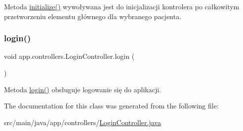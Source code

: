 Metoda \mbox{\hyperlink{classapp_1_1controllers_1_1_login_controller_aa342a8db861c23f873083658cefa7904}{initialize()}} wywoływana jest do inicjalizacji kontrolera po całkowitym przetworzeniu elementu głównego dla wybranego pacjenta. \mbox{\label{classapp_1_1controllers_1_1_login_controller_a89c1570ab24485594029d61f5c26e89d}} 
\subsubsection{\texorpdfstring{login()}{login()}}
{\footnotesize\ttfamily void app.\+controllers.\+Login\+Controller.\+login (\begin{DoxyParamCaption}{ }\end{DoxyParamCaption})}

Metoda \mbox{\hyperlink{classapp_1_1controllers_1_1_login_controller_a89c1570ab24485594029d61f5c26e89d}{login()}} obsługuje logowanie się do aplikacji. 

The documentation for this class was generated from the following file\+:\begin{DoxyCompactItemize}
\item 
src/main/java/app/controllers/\mbox{\hyperlink{_login_controller_8java}{Login\+Controller.\+java}}\end{DoxyCompactItemize}
